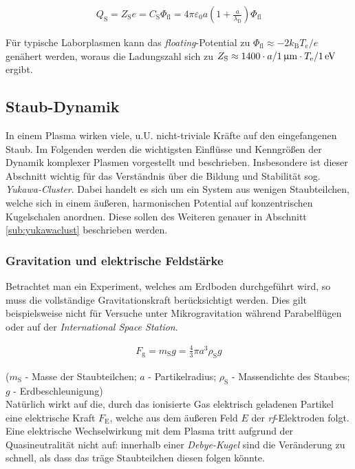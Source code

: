 \documentclass[numbers=noenddot,a4paper]{scrartcl}
\newcommand{\ix}[1]{_\text{#1}}
\newcommand{\tilt}[1]{\textit{#1}}
\begin{document}
				\begin{align}
					Q\ix{S}=Z\ix{S}e=C\ix{S}\Phi\ix{fl}=4\pi\varepsilon\ix{0}a\left(1+\frac{a}{\lambda\ix{D}}\right)\Phi\ix{fl} \label{eq:ladung}
				\end{align}

			Für typische Laborplasmen kann das \tilt{floating}-Potential zu $\Phi\ix{fl}\approx-2k\ix{B}T\ix{e}/e$ genähert werden, woraus die Ladungszahl sich zu $Z\ix{S}\approx1400\cdot a/\unit[1]{\upmu m}\cdot T\ix{e}/\unit[1]{eV}$ ergibt.

		\subsection{Staub-Dynamik}\label{sub:dynamik}

			In einem Plasma wirken viele, u.U. nicht-triviale Kräfte auf den eingefangenen Staub. Im Folgenden werden die wichtigsten Einflüsse und Kenngrößen der Dynamik komplexer Plasmen vorgestellt und beschrieben. Insbesondere ist dieser Abschnitt wichtig für das Verständnis über die Bildung und Stabilität sog. \tilt{Yukawa-Cluster}. Dabei handelt es sich um ein System aus wenigen Staubteilchen, welche sich in einem äußeren, harmonischen Potential auf konzentrischen Kugelschalen anordnen. Diese sollen des Weiteren genauer in Abschnitt \ref{sub:yukawaclust} beschrieben werden.

			\subsubsection{Gravitation und elektrische Feldstärke}\label{subsub:grav}

			Betrachtet man ein Experiment, welches am Erdboden durchgeführt wird, so muss die vollständige Gravitationskraft berücksichtigt werden. Dies gilt beispielsweise nicht für Versuche unter Mikrogravitation während Parabelflügen oder auf der \tilt{International Space Station}.

				\begin{align}
					F\ix{g}=m\ix{S} g=\frac{4}{3}\pi a^3 \rho\ix{S} g
				\end{align}

			($m\ix{S}$ - Masse der Staubteilchen; $a$ - Partikelradius; $\rho\ix{S}$ - Massendichte des Staubes; $g$ - \mbox{Erdbeschleunigung})\\
			Natürlich wirkt auf die, durch das ionisierte Gas elektrisch geladenen Partikel eine elektrische Kraft $F\ix{E}$, welche aus dem äußeren Feld $E$ der \tilt{rf}-Elektroden folgt. Eine elektrische Wechselwirkung mit dem Plasma tritt aufgrund der Quasineutralität nicht auf: innerhalb einer \tilt{Debye-Kugel} sind die Veränderung zu schnell, als dass das träge Staubteilchen diesen folgen könnte. 
\end{document}
